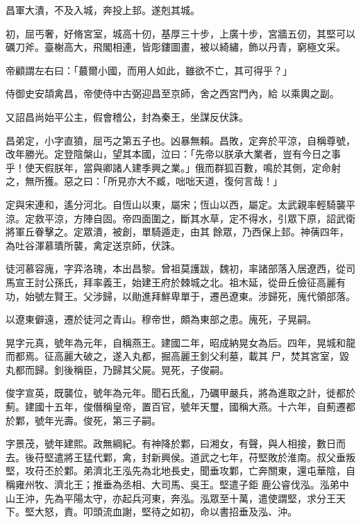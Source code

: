 \begin{pinyinscope}
 昌軍大潰，不及入城，奔投上邽。遂剋其城。



 初，屈丐奢，好脩宮室，城高十仞，基厚三十步，上廣十步，宮牆五仞，其堅可以礪刀斧。臺榭高大，飛閣相連，皆彫鏤圖畫，被以綺繡，飾以丹青，窮極文采。



 帝顧謂左右曰：「蕞爾小國，而用人如此，雖欲不亡，其可得乎？」



 侍御史安頡禽昌，帝使侍中古弼迎昌至京師，舍之西宮門內，給
 以乘輿之副。



 又詔昌尚始平公主，假會稽公，封為秦王，坐謀反伏誅。



 昌弟定，小字直獖，屈丐之第五子也。凶暴無賴。昌敗，定奔於平涼，自稱尊號，改年勝光。定登陰槃山，望其本國，泣曰：「先帝以朕承大業者，豈有今日之事乎！使天假朕年，當與卿諸人建季興之業。」俄而群狐百數，鳴於其側，定命射之，無所獲。惡之曰：「所見亦大不臧，咄咄天道，復何言哉！」



 定與宋連和，遙分河北。自恆山以東，屬宋；恆山以西，屬定。太武親率輕騎襲平涼。定救平涼，方陣自固。帝四面圍之，斷其水草，定不得水，引眾下原，詔武衛將軍丘眷擊之。定眾潰，被創，單騎遁走，由其
 餘眾，乃西保上邽。神蒨四年，為吐谷渾慕璝所襲，禽定送京師，伏誅。



 徒河慕容廆，字弈洛瑰，本出昌黎。曾祖莫護跋，魏初，率諸部落入居遼西，從司馬宣王討公孫氏，拜率義王，始建王府於棘城之北。祖木延，從毌丘儉征高麗有功，始號左賢王。父涉歸，以勛進拜鮮卑單于，遷邑遼東。涉歸死，廆代領部落。



 以遼東僻遠，遷於徒河之青山。穆帝世，頗為東部之患。廆死，子晃嗣。



 晃字元真，號年為元年，自稱燕王。建國二年，昭成納晃女為后。四年，晃城和龍而都焉。征高麗大破之，遂入丸都，掘高麗王釗父利墓，載其
 尸，焚其宮室，毀丸都而歸。釗後稱臣，乃歸其父屍。晃死，子俊嗣。



 俊字宣英，既襲位，號年為元年。聞石氏亂，乃礪甲嚴兵，將為進取之計，徙都於薊。建國十五年，俊僭稱皇帝，置百官，號年天璽，國稱大燕。十六年，自薊遷都於鄴，號年光壽。俊死，第三子嗣。



 字景茂，號年建熙。政無綱紀。有神降於鄴，曰湘女，有聲，與人相接，數日而去。後苻堅遣將王猛代鄴，禽，封新興侯。道武之七年，苻堅敗於淮南。叔父垂叛堅，攻苻丕於鄴。弟濟北王泓先為北地長史，聞垂攻鄴，亡奔關東，還屯華陰，自稱雍州牧、濟北王；推垂為丞相、大司馬、吳王。堅遣子鉅
 鹿公睿伐泓。泓弟中山王沖，先為平陽太守，亦起兵河東，奔泓。泓眾至十萬，遣使謂堅，求分王天下。堅大怒，責。叩頭流血謝，堅待之如初，命以書招垂及泓、沖。




\end{pinyinscope}
